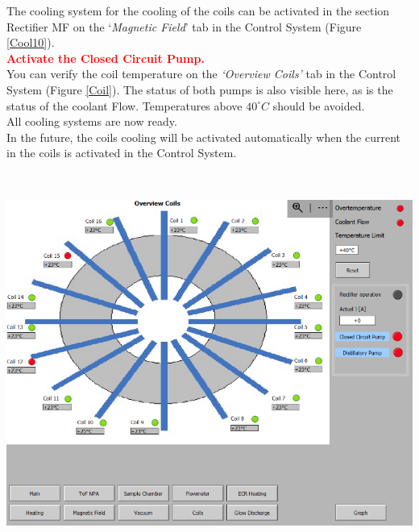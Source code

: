 \documentclass[fleqn,a4paper,20pt]{article}
\begin{document}
\begin{minipage}{.3\textwidth}
The cooling system for the cooling of the coils can be activated in the section Rectifier MF on the `\textit{Magnetic Field}' tab in the Control System (Figure \ref{Cool10}).\\

\textcolor{red}{\textbf{Activate the Closed Circuit Pump.}}\\
	
You can verify the coil temperature on the \textit{`Overview Coils'} tab in the Control System (Figure \ref{Coil}). The status of both pumps is also visible here, as is the status of the coolant Flow. Temperatures above $40^\circ C$ should be avoided.\\

All cooling systems are now ready.\\

In the future, the coils cooling will be activated automatically when the current in the coils is activated in the Control System.
	 
\end{minipage}
\begin{minipage}{.02\textwidth}
$\ $\\
\end{minipage}
\begin{minipage}{.68\textwidth}
\centering
\includegraphics[width=0.98\linewidth]{Coil}
\captionsetup{width=0.75\textwidth}
\label{Coil}
\end{minipage}
\end{document}
